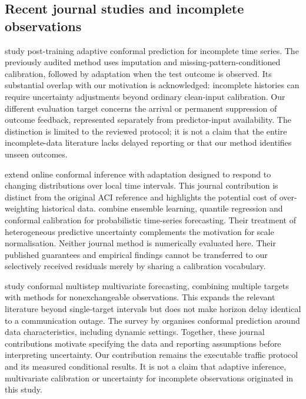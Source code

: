 \documentclass[pdflatex,sn-mathphys-num]{sn-jnl}
\begin{document}
\subsection{Recent journal studies and incomplete observations}
\citet{chen2026} study post-training adaptive conformal prediction for incomplete time series. The previously audited method uses imputation and missing-pattern-conditioned calibration, followed by adaptation when the test outcome is observed. Its substantial overlap with our motivation is acknowledged: incomplete histories can require uncertainty adjustments beyond ordinary clean-input calibration. Our different evaluation target concerns the arrival or permanent suppression of outcome feedback, represented separately from predictor-input availability. The distinction is limited to the reviewed protocol; it is not a claim that the entire incomplete-data literature lacks delayed reporting or that our method identifies unseen outcomes.

\citet{gibbs2024} extend online conformal inference with adaptation designed to respond to changing distributions over local time intervals. This journal contribution is distinct from the original ACI reference and highlights the potential cost of over-weighting historical data. \citet{jensen2024} combine ensemble learning, quantile regression and conformal calibration for probabilistic time-series forecasting. Their treatment of heterogeneous predictive uncertainty complements the motivation for scale normalisation. Neither journal method is numerically evaluated here. Their published guarantees and empirical findings cannot be transferred to our selectively received residuals merely by sharing a calibration vocabulary.

\citet{schlembach2025} study conformal multistep multivariate forecasting, combining multiple targets with methods for nonexchangeable observations. This expands the relevant literature beyond single-target intervals but does not make horizon delay identical to a communication outage. The survey by \citet{zhou2025} organises conformal prediction around data characteristics, including dynamic settings. Together, these journal contributions motivate specifying the data and reporting assumptions before interpreting uncertainty. Our contribution remains the executable traffic protocol and its measured conditional results. It is not a claim that adaptive inference, multivariate calibration or uncertainty for incomplete observations originated in this study.
\end{document}
